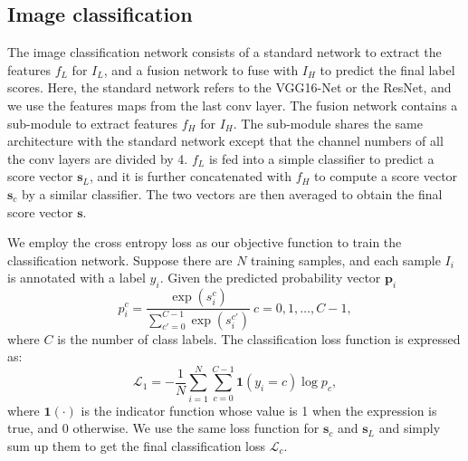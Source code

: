\documentclass[letterpaper]{article} %
\begin{document}
\subsection{Image classification}
The image classification network consists of a standard network to extract the features $f_L$ for $I_L$, and a fusion network to fuse with $I_H$ to predict the final label scores. Here, the standard network refers to the VGG16-Net or the ResNet, and we use the features maps from the last conv layer. The fusion network contains a sub-module to extract features $f_H$ for $I_H$. The sub-module shares the same architecture with the standard network except that the channel numbers of all the conv layers are divided by 4. $f_L$ is fed into a simple classifier to predict a score vector $\mathbf{s}_L$, and it is further concatenated with $f_H$ to compute a score vector $\mathbf{s}_c$ by a similar classifier. The two vectors are then averaged to obtain the final score vector $\mathbf{s}$.

We employ the cross entropy loss as our objective function to train the classification network. Suppose there are $N$ training samples, and each sample $I_i$ is annotated with a label $y_i$.
Given the predicted probability vector $\mathbf{p}_i$
\begin{equation}
p_{i}^c= \frac{\exp(s_{i}^c)}{\sum_{c'=0}^{C-1}\exp(s_{i}^{c'})} \ c=0,1,\dots,C-1,
\end{equation}
where $C$ is the number of class labels. The classification loss function is expressed as:
\begin{equation}
\mathcal{L}_{{1}}=-\frac{1}{N}\sum_{i=1}^N\sum_{c=0}^{C-1}\mathbf{1}(y_i=c)\log{p_c},
\end{equation}
where $\mathbf{1}(\cdot)$ is the indicator function whose value is 1 when the expression is true, and 0 otherwise. We use the same loss function for $\mathbf{s}_c$ and $\mathbf{s}_L$ and simply sum up them to get the final classification loss $\mathcal{L}_c$.
\end{document}
